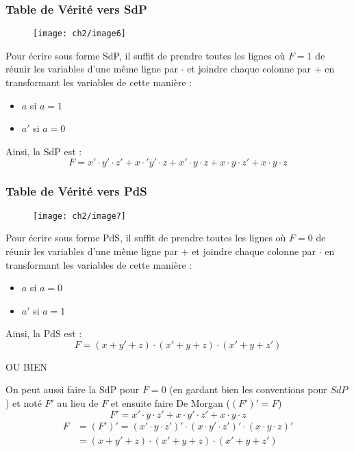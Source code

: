 \subsubsection{Table de Vérité vers SdP}
\label{subsubsec : TdV->SdP}
\begin{figure}[H]
	\centering
	\texttt{[image: ch2/image6]}
\end{figure}
Pour écrire sous forme SdP, il suffit de prendre toutes les lignes où $F=1$ de réunir les variables d'une même ligne par $\cdot$ et joindre chaque colonne par $+$ en transformant les variables de cette manière :
\begin{itemize}
	\item $a$ si $a=1$
	\item $a'$ si $a=0$
\end{itemize}
Ainsi, la SdP est :
\begin{equation}
	F=x'\cdot y'\cdot z'+x\cdot' y'\cdot z+x'\cdot y\cdot z+x\cdot y\cdot z'+x\cdot y\cdot z
\end{equation}
\subsubsection{Table de Vérité vers PdS}
\label{subsubsec : TdV->PdS}
\begin{figure}[H]
	\centering
	\texttt{[image: ch2/image7]}
\end{figure}
Pour écrire sous forme PdS, il suffit de prendre toutes les lignes où $F=0$ de réunir les variables d'une même ligne par $+$ et joindre chaque colonne par $\cdot$ en transformant les variables de cette manière :
\begin{itemize}
	\item $a$ si $a=0$
	\item $a'$ si $a=1$
\end{itemize}
Ainsi, la PdS est :
\begin{equation}
F=(x+y'+z)\cdot(x'+y+z)\cdot(x'+y+z')
\end{equation}
\begin{center}
	OU BIEN
\end{center}
On peut aussi faire la SdP pour $F=0$ (en gardant bien les conventions pour $SdP$) et noté $F'$ au lieu de $F$ et ensuite faire De Morgan ($(F')'=F$)
\begin{equation}
F'= x'\cdot y\cdot z'+x\cdot y'\cdot z'+x\cdot y\cdot z
\end{equation}
\begin{align}
	F &=(F')'=(x'\cdot y\cdot z')'\cdot(x\cdot y'\cdot z')'\cdot(x\cdot y\cdot z)'\\
	&= (x+y'+z)\cdot(x'+y+z)\cdot(x'+y+z')
\end{align}
